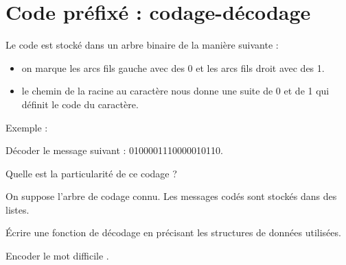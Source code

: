 \renewcommand{\SourceFile}{4-arborescences/src/4-3.ml}

\section{Code préfixé : codage-décodage}

Le code est stocké dans un arbre binaire de la manière suivante :
\begin{itemize}
    \item on marque les arcs \og fils gauche \fg{} avec des 0 et les arcs \og fils droit \fg{} avec des 1.
    \item le chemin de la racine au caractère nous donne une suite de 0 et de 1 qui définit le code du caractère.
\end{itemize}
\medskip

Exemple :

\begin{center}
\end{center}

\Q
Décoder le message suivant : 0100001110000010110.
\medskip

Quelle est la particularité de ce codage ?

\Q
On suppose l'arbre de codage connu. Les messages codés sont stockés dans des listes.
\medskip

Écrire une fonction de décodage en précisant les structures de données utilisées.

\Q
Encoder le mot \og difficile \fg{}.
\medskip


